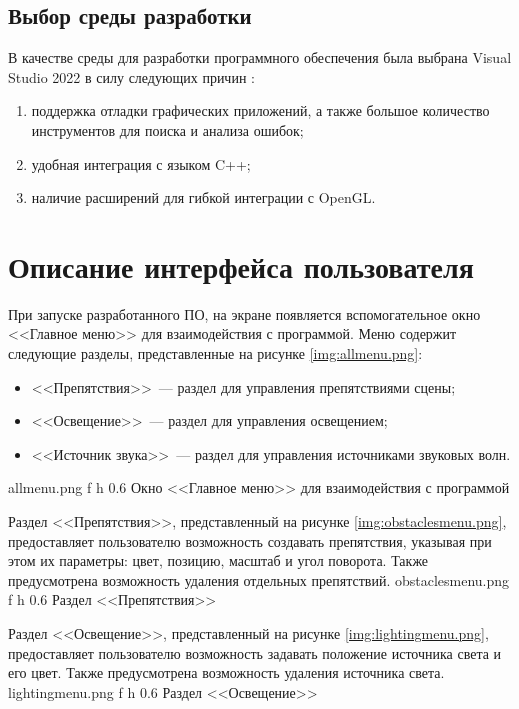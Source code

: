 \clearpage

\subsection{Выбор среды разработки} 

В качестве среды для разработки программного обеспечения была выбрана Visual Studio 2022 в силу следующих причин \cite{vs2022}:
\begin{enumerate}
	\item поддержка отладки графических приложений, а также большое количество инструментов для поиска и анализа ошибок;
	\item удобная интеграция с языком C++;
	\item наличие расширений для гибкой интеграции с OpenGL.
\end{enumerate}

\section{Описание интерфейса пользователя}

При запуске разработанного ПО, на экране появляется вспомогательное окно <<Главное меню>> для взаимодействия с программой.
Меню содержит следующие разделы, представленные на рисунке \ref{img:allmenu.png}:
\begin{itemize}
	\item <<Препятствия>>~--- раздел для управления препятствиями сцены;
	\item <<Освещение>>~--- раздел для управления освещением;
	\item <<Источник звука>>~--- раздел для управления источниками звуковых волн.
\end{itemize}
	{allmenu.png}
	{f}
	{h}
	{0.6\textwidth}
	{Окно <<Главное меню>> для взаимодействия с программой}

\clearpage

Раздел <<Препятствия>>, представленный на рисунке \ref{img:obstaclesmenu.png}, предоставляет пользователю возможность создавать препятствия, указывая при этом их параметры: цвет, позицию, масштаб и угол поворота.
Также предусмотрена возможность удаления отдельных препятствий.
	{obstaclesmenu.png}
	{f}
	{h}
	{0.6\textwidth}
	{Раздел <<Препятствия>>}
	
\clearpage
	
Раздел <<Освещение>>, представленный на рисунке \ref{img:lightingmenu.png}, предоставляет пользователю возможность задавать положение источника света и его цвет.
Также предусмотрена возможность удаления источника света.
	{lightingmenu.png}
	{f}
	{h}
	{0.6\textwidth}
	{Раздел <<Освещение>>}
	
